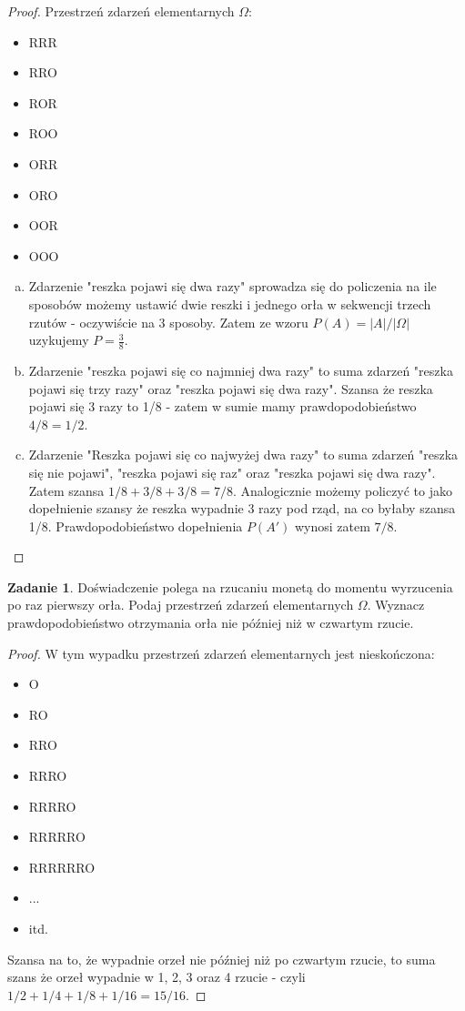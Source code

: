 \documentclass[11pt]{article}
\theoremstyle{definition}
\newtheorem{zadanie}{Zadanie}
\numberwithin{zadanie}{section}
\begin{document}
\begin{proof}
    Przestrzeń zdarzeń elementarnych $\Omega$:
    \begin{itemize}
        \item RRR
        \item RRO
        \item ROR
        \item ROO
        \item ORR
        \item ORO
        \item OOR
        \item OOO
    \end{itemize}

    \begin{enumerate}[a)]
        \item Zdarzenie "reszka pojawi się dwa razy" sprowadza się do policzenia na ile sposobów możemy ustawić dwie reszki i jednego orła w sekwencji trzech rzutów - oczywiście na 3 sposoby. Zatem ze wzoru $P(A) = |A| / |\Omega|$ uzykujemy $P = \frac38$.
        \item Zdarzenie "reszka pojawi się co najmniej dwa razy" to suma zdarzeń "reszka pojawi się trzy razy" oraz "reszka pojawi się dwa razy". Szansa że reszka pojawi się 3 razy to 1/8 - zatem w sumie mamy prawdopodobieństwo $4/8 = 1/2.$
        \item Zdarzenie "Reszka pojawi się co najwyżej dwa razy" to suma zdarzeń "reszka się nie pojawi", "reszka pojawi się raz" oraz "reszka pojawi się dwa razy". Zatem szansa $1/8 + 3/8 + 3/8 = 7/8$. Analogicznie możemy policzyć to jako dopełnienie szansy że reszka wypadnie 3 razy pod rząd, na co byłaby szansa 1/8. Prawdopodobieństwo dopełnienia $P(A')$ wynosi zatem $7/8$.
    \end{enumerate}
\end{proof}

\begin{zadanie}
    Doświadczenie polega na rzucaniu monetą do momentu wyrzucenia po raz pierwszy orła. Podaj przestrzeń zdarzeń elementarnych $\Omega$. Wyznacz prawdopodobieństwo otrzymania orła nie później niż w czwartym rzucie.
\end{zadanie}

\begin{proof}
    W tym wypadku przestrzeń zdarzeń elementarnych jest nieskończona:
    \begin{itemize}
        \item O
        \item RO
        \item RRO
        \item RRRO
        \item RRRRO
        \item RRRRRO
        \item RRRRRRO
        \item ...
        \item itd.
    \end{itemize}

    Szansa na to, że wypadnie orzeł nie później niż po czwartym rzucie, to suma szans że orzeł wypadnie w 1, 2, 3 oraz 4 rzucie - czyli $1/2 + 1/4 + 1/8 + 1/16 = 15/16.$
\end{proof}
\end{document}
